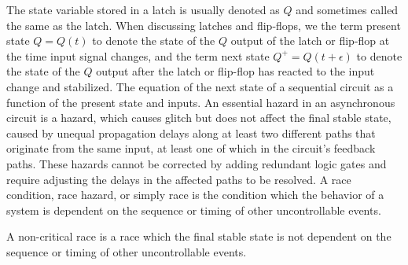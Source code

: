 \documentclass[a4paper,12pt]{report}
\begin{document}
The state variable stored in a latch is usually denoted as $Q$ and sometimes called the same as the latch.
When discussing latches and flip-flops, we the term present state $Q=Q(t)$ to denote the state of the $Q$ output of the latch or flip-flop at the time input signal changes, and the term next state $Q^+=Q(t+\epsilon)$ to denote the state of the $Q$ output after the latch or flip-flop has reacted to the input change and stabilized.
The equation of the next state of a sequential circuit as a function of the present state and inputs.
An essential hazard in an asynchronous circuit is a hazard, which causes glitch but does not affect the final stable state, caused by unequal propagation delays along at least two different paths that originate from the same input, at least one of which in the circuit's feedback paths. These hazards cannot be corrected by adding redundant logic gates and require adjusting the delays in the affected paths to be resolved.
A race condition, race hazard, or simply race is the condition which the behavior of a system is dependent on the sequence or timing of other uncontrollable events.

A non-critical race is a race which the final stable state is not dependent on the sequence or timing of other uncontrollable events.
\end{document}
